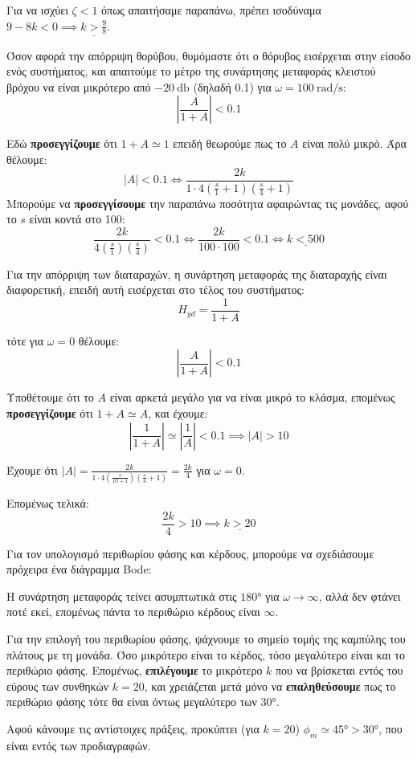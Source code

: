 \documentclass[11pt,a4paper,notitlepage,fleqn]{article}
\begin{document}
\begin{exercise}
Για να ισχύει \( ζ<1 \) όπως απαιτήσαμε παραπάνω, πρέπει ισοδύναμα \( 9-8k < 0
\implies \underline{k>\frac{9}{8}} \).

Όσον αφορά την απόρριψη θορύβου, θυμόμαστε ότι ο θόρυβος εισέρχεται στην είσοδο ενός
συστήματος, και απαιτούμε το μέτρο της συνάρτησης μεταφοράς κλειστού βρόχου να είναι
μικρότερο από \( -\SI{20}{\decibel} \) (δηλαδή 0.1) για \( \omega = \SI{100}{\radian/\second} \):
\[
\left|\frac{A}{1+A}\right| < 0.1
\]

Εδώ \textbf{προσεγγίζουμε} ότι \( 1+A \simeq 1 \) επειδή θεωρούμε πως το \( A \) είναι πολύ
μικρό. Άρα θέλουμε:
\[
|A| < 0.1 \iff \frac{2k}{1\cdot 4 \left(\frac{s}{1}+1\right)\left(\frac{s}{4}+1\right)}
\]
Μπορούμε να \textbf{προσεγγίσουμε} την παραπάνω ποσότητα αφαιρώντας τις μονάδες, αφού το
\( s \) είναι κοντά στο 100:
\[
\frac{2k}{4\left(\frac{s}{1}\right)\left(\frac{s}{4}\right)}
< 0.1
\iff \frac{2k}{100\cdot 100} < 0.1
\iff \underline{k < 500}
\]

Για την απόρριψη των διαταραχών, η συνάρτηση μεταφοράς της διαταραχής είναι διαφορετική,
επειδή αυτή εισέρχεται στο τέλος του συστήματος:
\[
H_{yd} = \frac{1}{1+A}
\]

τότε για \( \omega = 0 \) θέλουμε:
\[
\left|\frac{A}{1+A}\right| < 0.1
\]

Υποθέτουμε ότι το \( A \) είναι αρκετά μεγάλο για να είναι μικρό το κλάσμα, επομένως
\textbf{προσεγγίζουμε} ότι \( 1+A \simeq A \), και έχουμε:
\[
\left|\frac{1}{1+A}\right| \simeq \left|\frac{1}{A}\right| < 0.1
\implies \left|A\right| > 10
\]

Έχουμε ότι \( \left|A\right| = \frac{2k}{1\cdot4 \left(\frac{s}{10+1}\right)\left(\frac{s}{4}+1\right)} = \frac{2k}{4}\) για \( \omega = 0 \).

Επομένως τελικά:
\[
\frac{2k}{4} > 10 \implies \underline{k > 20}
\]

Για τον υπολογισμό περιθωρίου φάσης και κέρδους, μπορούμε να σχεδιάσουμε πρόχειρα ένα
διάγραμμα Bode:

Η συνάρτηση μεταφοράς τείνει ασυμπτωτικά στις \( \ang{180} \) για \( \omega \to \infty \), αλλά δεν φτάνει ποτέ εκεί, επομένως πάντα το περιθώριο κέρδους είναι \( \infty \).

Για την επιλογή του περιθωρίου φάσης, ψάχνουμε το σημείο τομής της καμπύλης του πλάτους
με τη μονάδα. Όσο μικρότερο είναι το κέρδος, τόσο μεγαλύτερο είναι και το περιθώριο
φάσης. Επομένως, \textbf{επιλέγουμε} το μικρότερο \( k \) που να βρίσκεται εντός
του εύρους των συνθηκών \( k=20 \), και χρειάζεται μετά μόνο να \textbf{επαληθεύσουμε} πως το περιθώριο
φάσης τότε θα είναι όντως μεγαλύτερο των \( \ang{30} \).

Αφού κάνουμε τις αντίστοιχες πράξεις, προκύπτει (για \( k=20 \)) \( \phi_m \simeq \ang{45} > \ang{30}\),
που είναι εντός των προδιαγραφών.

\end{exercise}
\end{document}
